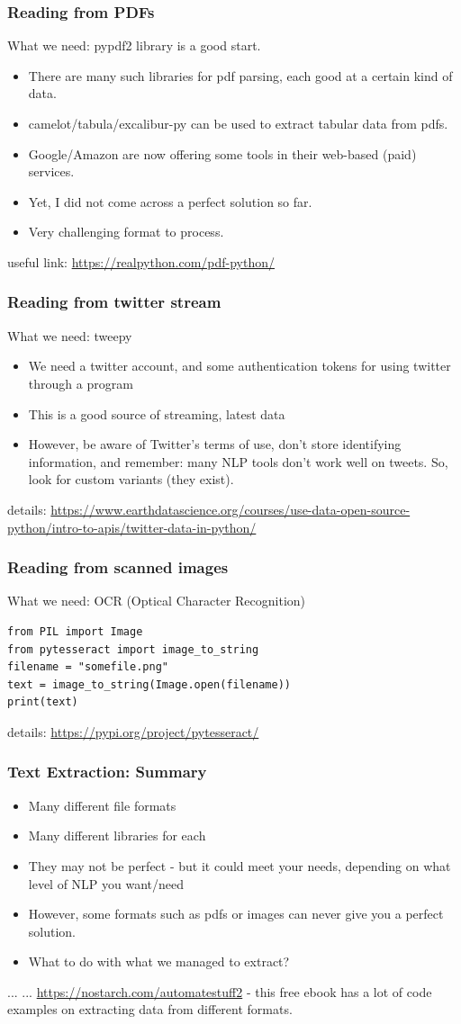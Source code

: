 \documentclass{beamer}
\begin{document}
\begin{frame}
\frametitle{Reading from PDFs}
What we need: pypdf2 library is a good start. 
\begin{itemize}
\item There are many such libraries for pdf parsing, each good at a certain kind of data.
\item camelot/tabula/excalibur-py can be used to extract tabular data from pdfs.
\item Google/Amazon are now offering some tools in their web-based (paid) services.
\item Yet, I did not come across a perfect solution so far. 
\item Very challenging format to process. 
\end{itemize}
\tiny useful link: \url{https://realpython.com/pdf-python/}
\end{frame} 

\begin{frame}
\frametitle{Reading from twitter stream}
What we need: tweepy
\begin{itemize}
\item We need a twitter account, and some authentication tokens for using twitter through a program
\item This is a good source of streaming, latest data
\item However, be aware of Twitter's terms of use, don't store identifying information, and remember: many NLP tools don't work well on tweets. So, look for custom variants (they exist). 
\end{itemize}
\tiny
details: \url{https://www.earthdatascience.org/courses/use-data-open-source-python/intro-to-apis/twitter-data-in-python/}
\end{frame}

\begin{frame}[fragile]
\frametitle{Reading from scanned images}
What we need: OCR (Optical Character Recognition)
\begin{verbatim}
from PIL import Image
from pytesseract import image_to_string
filename = "somefile.png"
text = image_to_string(Image.open(filename))
print(text)
\end{verbatim}
\tiny details: \url{https://pypi.org/project/pytesseract/}
\end{frame}

\begin{frame}
\frametitle{Text Extraction: Summary}
\begin{itemize}
\item Many different file formats
\item Many different libraries for each
\item They may not be perfect - but it could meet your needs, depending on what level of NLP you want/need
\item However, some formats such as pdfs or images can never give you a perfect solution.
\item What to do with what we managed to extract?
\end{itemize}
... ...
\tiny \url{https://nostarch.com/automatestuff2} - this free ebook has a lot of code examples on extracting data from different formats. 
\end{frame}
\end{document}
